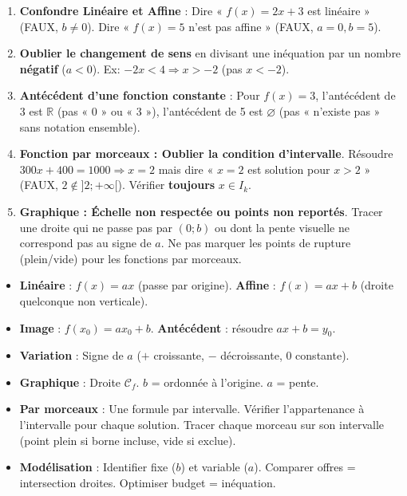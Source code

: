 \documentclass[11pt]{article}
\begin{document}
\begin{attention}
    \begin{enumerate}
        \item \textbf{Confondre Linéaire et Affine} : Dire « $f(x)=2x+3$ est linéaire » (FAUX, $b\neq0$). Dire « $f(x)=5$ n'est pas affine » (FAUX, $a=0, b=5$).
        \item \textbf{Oublier le changement de sens} en divisant une inéquation par un nombre \textbf{négatif} ($a<0$). Ex: $-2x < 4 \Rightarrow x > -2$ (pas $x < -2$).
        \item \textbf{Antécédent d'une fonction constante} : Pour $f(x)=3$, l'antécédent de 3 est $\mathbb{R}$ (pas « 0 » ou « 3 »), l'antécédent de 5 est $\varnothing$ (pas « n'existe pas » sans notation ensemble).
        \item \textbf{Fonction par morceaux : Oublier la condition d'intervalle}. Résoudre $300x+400=1000 \Rightarrow x=2$ mais dire « $x=2$ est solution pour $x>2$ » (FAUX, $2 \notin ]2;+\infty[$). Vérifier \textbf{toujours} $x \in I_k$.
        \item \textbf{Graphique : Échelle non respectée ou points non reportés}. Tracer une droite qui ne passe pas par $(0;b)$ ou dont la pente visuelle ne correspond pas au signe de $a$. Ne pas marquer les points de rupture (plein/vide) pour les fonctions par morceaux.
    \end{enumerate}
\end{attention}

\begin{aretenir}
    \begin{itemize}
        \item \textbf{Linéaire} : $f(x)=ax$ (passe par origine). \textbf{Affine} : $f(x)=ax+b$ (droite quelconque non verticale).
        \item \textbf{Image} : $f(x_0)=ax_0+b$. \textbf{Antécédent} : résoudre $ax+b=y_0$.
        \item \textbf{Variation} : Signe de $a$ ($+$ croissante, $-$ décroissante, $0$ constante).
        \item \textbf{Graphique} : Droite $\mathcal{C}_f$. $b$ = ordonnée à l'origine. $a$ = pente.
        \item \textbf{Par morceaux} : Une formule par intervalle. Vérifier l'appartenance à l'intervalle pour chaque solution. Tracer chaque morceau sur son intervalle (point plein si borne incluse, vide si exclue).
        \item \textbf{Modélisation} : Identifier fixe ($b$) et variable ($a$). Comparer offres = intersection droites. Optimiser budget = inéquation.
    \end{itemize}
\end{aretenir}
\end{document}
